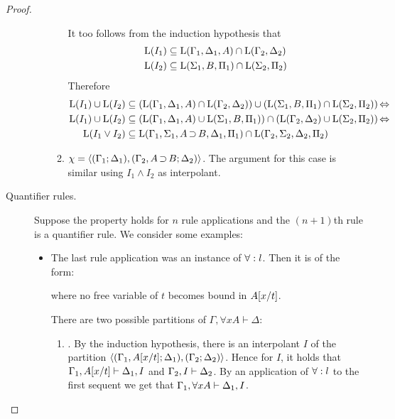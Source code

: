 \begin{proof}
\begin{description}
\begin{itemize}
\begin{enumerate}
{								It too follows from the induction hypothesis that
								\begin{align*}
									\operatorname{L}(I_1) &\subseteq \operatorname{L}(\Gamma_1, \Delta_1, A) \cap \operatorname{L}(\Gamma_2, \Delta_2) \\
									\operatorname{L}(I_2) &\subseteq \operatorname{L}(\Sigma_1, B, \Pi_1) \cap \operatorname{L}(\Sigma_2, \Pi_2)
								\end{align*}
								Therefore
								\begin{align*}
									\operatorname{L}(I_1) \cup \operatorname{L}(I_2) &\subseteq
									(\operatorname{L}(\Gamma_1, \Delta_1, A) \cap \operatorname{L}(\Gamma_2, \Delta_2)) \cup ( \operatorname{L}(\Sigma_1, B, \Pi_1) \cap \operatorname{L}(\Sigma_2, \Pi_2)) \operatorname{\Leftrightarrow} \\
									\operatorname{L}(I_1) \cup \operatorname{L}(I_2) &\subseteq
									(\operatorname{L}(\Gamma_1, \Delta_1, A) \cup \operatorname{L}(\Sigma_1, B, \Pi_1)) \cap (\operatorname{L}(\Gamma_2, \Delta_2) \cup \operatorname{L}(\Sigma_2, \Pi_2)) \operatorname{\Leftrightarrow} \\
									\operatorname{L}(I_1 \lor I_2) &\subseteq \operatorname{L}(\Gamma_1, \Sigma_1, A\operatorname{\supset} B, \Delta_1, \Pi_1) \cap \operatorname{L}(\Gamma_2, \Sigma_2, \Delta_2, \Pi_2)
								\end{align*}

							}

						\item $\chi =  \langle (\Gamma_1; \Delta_1), (\Gamma_2, A\operatorname{\supset} B; \Delta_2)\rangle $.
							The argument for this case is similar using $I_1 \land I_2$ as interpolant.
					\end{enumerate}

			\end{itemize}

		\item[\normalfont Quantifier rules.]
			Suppose the property holds for $n$ rule applications and the $(n+1)$th rule is a quantifier rule.
			We consider some examples:

			\begin{itemize}
				\item The last rule application was an instance of $\forall:l$. Then it is of the form:
					\begin{prooftree}
					\end{prooftree}
					where no free variable of $t$ becomes bound in $A[x/t]$.

					There are two possible partitions of $\Gamma, \forall x A \vdash \Delta$:
					\begin{enumerate}
						\item {}.
							By the induction hypothesis, there is an interpolant $I$ of the partition $ \langle (\Gamma_1, A[x/t]; \Delta_1), (\Gamma_2; \Delta_2)\rangle $.
							Hence for $I$, it holds that
							$\Gamma_1, A[x/t] \vdash \Delta_1, I$ and  
							$\Gamma_2, I \vdash \Delta_2$.
							By an application of $\forall:l$ to the first sequent we get that $\Gamma_1, \forall x A\vdash \Delta_1, I$.


\end{enumerate}
\end{itemize}
\end{description}
\end{proof}
